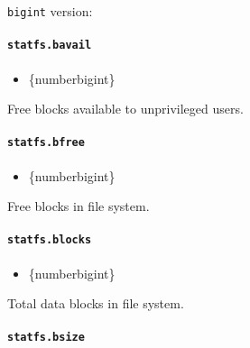 \texttt{bigint} version:

\begin{Shaded}
\begin{Highlighting}[]
\NormalTok{\}}
\end{Highlighting}
\end{Shaded}

\paragraph{\texorpdfstring{\texttt{statfs.bavail}}{statfs.bavail}}\label{statfs.bavail}

\begin{itemize}
\tightlist
\item
  \{number\textbar bigint\}
\end{itemize}

Free blocks available to unprivileged users.

\paragraph{\texorpdfstring{\texttt{statfs.bfree}}{statfs.bfree}}\label{statfs.bfree}

\begin{itemize}
\tightlist
\item
  \{number\textbar bigint\}
\end{itemize}

Free blocks in file system.

\paragraph{\texorpdfstring{\texttt{statfs.blocks}}{statfs.blocks}}\label{statfs.blocks}

\begin{itemize}
\tightlist
\item
  \{number\textbar bigint\}
\end{itemize}

Total data blocks in file system.

\paragraph{\texorpdfstring{\texttt{statfs.bsize}}{statfs.bsize}}\label{statfs.bsize}

